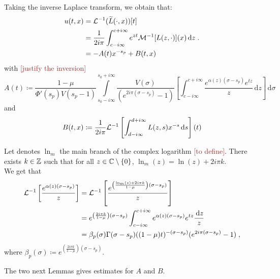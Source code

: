 \documentclass[11pt]{amsart}
\newcommand{\diff}{\,\mathrm{d}}
\newcommand{\ndr}[1]{\textcolor{brown}{[#1]}}
\begin{document}
Taking the inverse Laplace transform, we obtain that: 
\begin{align}
     u(t,x) &= \Lcal^{-1}(\tilde L(\cdot, x))[t] \\
     &= \frac{1}{2i\pi } \int_{c-i\infty}^{c+i\infty} e^{zt}\Mcal^{-1}[L(z,\cdot)](x) \diff z
     \eqfinp\\
     &= -A(t)x^{-s_p} + B(t,x)
\end{align}
with \ndr{justify the inversion}
\begin{equation}
    A(t) \coloneqq\frac{1-\mu}{\Phi'(s_p) V(s_p-1)}
     \int\limits_{s_0-i\infty}^{s_0+i\infty}
     \frac{V(\sigma)
  }{(e^{2i\pi(\sigma-s_p)}-1)} \left[\int_{c-i\infty}^{c+i\infty} \frac{e^{ \alpha(z)(\sigma-s_p)}e^{tz}}{z}\diff z \right] \diff \sigma
  \label{def:A} 
\end{equation}
and 
\begin{equation}
    B(t,x) \coloneqq \frac{1}{2i\pi} \Lcal^{-1}\left[\int_{d-i\infty}^{d+i\infty} L(z,s)x^{-s}\diff s \right] (t)
\label{def:B}
\end{equation}

Let denotes $\ln_{m}$  the main branch of the complex logarithm \ndr{to define}. There exists $k \in \mathbb{Z}$ such that for all $z \in \mathbb{C} \setminus \{0\}$, $\ln_m(z) = \ln(z) + 2i\pi k. $ \\
We get that 
\begin{subequations}
\begin{align}
    \Lcal^{-1}\left[ \frac{e^{ \alpha(z)(\sigma-s_p)}}{z}  \right]
    &= 
    \Lcal^{-1}\left[ \frac{e^{ \left( \frac{\ln_m(z) + 2i\pi k}{1-\mu} \right) (\sigma-s_p)}}{z}  \right] \\
    &= 
    e^{ \left( \frac{2i\pi k}{1-\mu} \right) (\sigma-s_p)}
    \int_{c-i\infty}^{c+i\infty} e^{ \alpha(z)(\sigma-s_p)}e^{tz}\frac{\diff z}{z}\\
    &= \beta_p(\sigma) \Gamma(\sigma-s_p)((1-\mu)t)^{-(\sigma-s_p)}(e^{2i\pi(\sigma-s_p)}-1)
    \eqfinv
\end{align}
\label{eq:calcLaplInv}
\end{subequations}
where $\beta_p(\sigma) \coloneqq e^{ \left( \frac{2i\pi k}{1-\mu} \right) (\sigma-s_p)}$. 

The two next Lemmas gives estimates for $A$ and $B$. 
\end{document}
